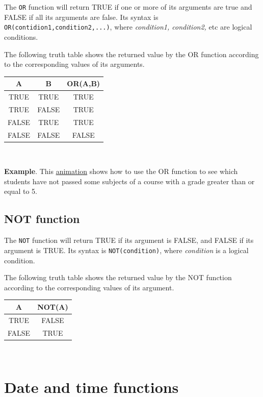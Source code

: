 The \texttt{OR} function will return TRUE if one or more of its arguments are true and FALSE if all its arguments are false. Its syntax is \texttt{OR(contidion1,condition2,...)}, where \emph{condition1, condition2,} etc are logical conditions.

The following truth table shows the returned value by the OR function according to the corresponding values of its
arguments.

\begin{longtable}{|c|c|c|}
\hline
A & B & OR(A,B)\\
\hline
TRUE & TRUE & TRUE\\
TRUE & FALSE & TRUE\\
FALSE & TRUE & TRUE\\
FALSE & FALSE & FALSE\\
\hline
\end{longtable}

~{}

\textbf{Example}. This \href{http://aprendeconalf.es/office/excel/manual/img/example_function_or.gif}{animation} shows how to use the OR function to see which students have not passed some subjects of a course with a grade greater than or equal to 5.

\subsection{NOT function}\hypertarget{not-function}{}\label{not-function}

The \texttt{NOT} function will return TRUE if its argument is FALSE, and FALSE if its argument is TRUE. Its syntax is \texttt{NOT(condition)}, where \emph{condition} is a logical condition.

The following truth table shows the returned value by the NOT function according to the corresponding values of its
argument.

\begin{longtable}{|c|c|}
\hline
A & NOT(A)\\
\hline
TRUE & FALSE\\
FALSE & TRUE\\
\hline
\end{longtable}

~{}

\section{Date and time functions}\hypertarget{date-and-time-functions}{}\label{date-and-time-functions}

